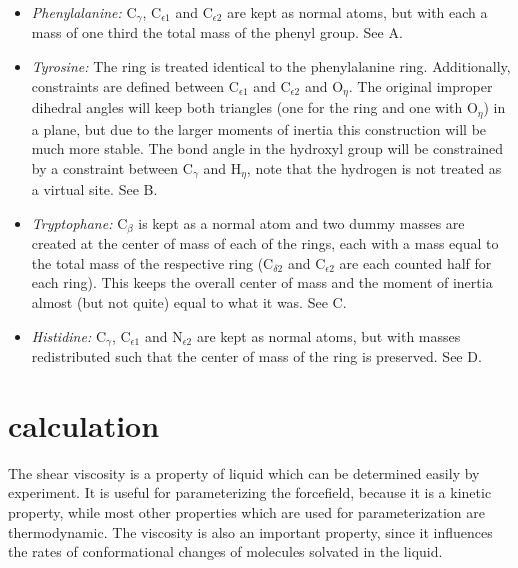 \begin{itemize}

\item{\em Phenylalanine:\/} {\sf C}$_\gamma$, {\sf C}$_{{\epsilon}1}$
and {\sf C}$_{{\epsilon}2}$ are kept as normal atoms, but with each a
mass of one third the total mass of the phenyl group. See
A.

\item{\em Tyrosine:\/} The ring is treated identical to the
phenylalanine ring. Additionally, constraints are defined between {\sf
C}$_{{\epsilon}1}$ and {\sf C}$_{{\epsilon}2}$ and {\sf O}$_{\eta}$.
The original improper dihedral angles will keep both triangles (one
for the ring and one with {\sf O}$_{\eta}$) in a plane, but due to the
larger moments of inertia this construction will be much more
stable. The bond angle in the hydroxyl group will be constrained by a
constraint between {\sf C}$_\gamma$ and {\sf H}$_{\eta}$, note that
the hydrogen is not treated as a virtual site. See
B.

\item{\em Tryptophane:\/} {\sf C}$_\beta$ is kept as a normal atom
and two dummy masses are created at the center of mass of each of the
rings, each with a mass equal to the total mass of the respective ring
({\sf C}$_{{\delta}2}$ and {\sf C}$_{{\epsilon}2}$ are each
counted half for each ring). This keeps the overall center of mass and
the moment of inertia almost (but not quite) equal to what it was. See
C.

\item{\em Histidine:\/} {\sf C}$_\gamma$, {\sf C}$_{{\epsilon}1}$
and {\sf N}$_{{\epsilon}2}$ are kept as normal atoms, but with masses
redistributed such that the center of mass of the ring is
preserved. See D.

\end{itemize}

\section{ calculation}

The shear viscosity is a property of liquid which can be determined easily  
by experiment. It is useful for parameterizing the forcefield,
because it is a kinetic property, while most other properties
which are used for parameterization are thermodynamic.
The viscosity is also an important property, since it influences
the rates of conformational changes of molecules solvated in the liquid.

